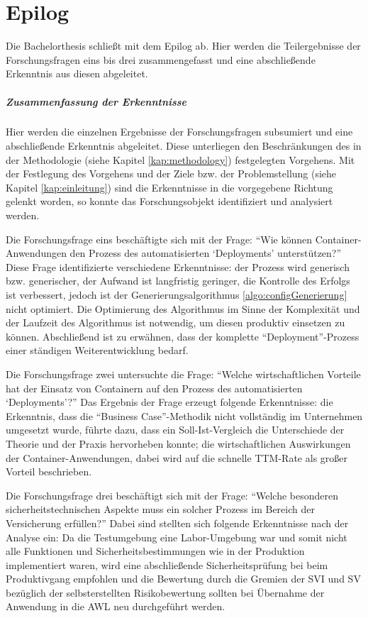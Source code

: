 \chapter{Epilog} \label{kritischeBetrachtung}
Die Bachelorthesis schließt mit dem Epilog ab. Hier werden die Teilergebnisse der Forschungsfragen eins bis drei zusammengefasst und eine abschließende Erkenntnis aus diesen abgeleitet. 
\paragraph{Zusammenfassung der Erkenntnisse}
Hier werden die einzelnen Ergebnisse der Forschungsfragen subsumiert und eine abschließende Erkenntnis abgeleitet. Diese unterliegen den Beschränkungen des in der Methodologie (siehe Kapitel \vref{kap:methodology}) festgelegten Vorgehens. Mit der Festlegung des Vorgehens und der Ziele bzw. der Problemstellung (siehe Kapitel \vref{kap:einleitung}) sind die Erkenntnisse in die vorgegebene Richtung gelenkt worden, so konnte das Forschungsobjekt identifiziert und analysiert werden.
\par
Die Forschungsfrage eins beschäftigte sich mit der Frage: \enquote{Wie können Container-Anwendungen den Prozess des automatisierten \enquote{Deployments} unterstützen?} Diese Frage identifizierte verschiedene Erkenntnisse: der Prozess wird generisch bzw. generischer, der Aufwand ist langfristig geringer, die Kontrolle des Erfolgs ist verbessert, jedoch ist der Generierungsalgorithmus \vref{algo:configGenerierung} nicht optimiert. Die Optimierung des Algorithmus im Sinne der Komplexität und der Laufzeit des Algorithmus ist notwendig, um diesen produktiv einsetzen zu können. Abschließend ist zu erwähnen, dass der komplette \enquote{Deployment}-Prozess einer ständigen Weiterentwicklung bedarf.
\par
Die Forschungsfrage zwei untersuchte die Frage: \enquote{Welche wirtschaftlichen Vorteile hat der Einsatz von Containern auf den Prozess des automatisierten \enquote{Deployments}?} Das Ergebnis der Frage erzeugt folgende Erkenntnisse: die Erkenntnis, dass die \enquote{Business Case}-Methodik nicht vollständig im Unternehmen umgesetzt wurde, führte dazu, dass ein Soll-Ist-Vergleich die Unterschiede der Theorie und der Praxis hervorheben konnte; die wirtschaftlichen Auswirkungen der Container-Anwendungen, dabei wird auf die schnelle \ac{TTM}-Rate als großer Vorteil beschrieben.
\par
Die Forschungsfrage drei beschäftigt sich mit der Frage: \enquote{Welche besonderen sicherheitstechnischen Aspekte muss ein solcher Prozess im Bereich der Versicherung erfüllen?} Dabei sind stellten sich folgende Erkenntnisse nach der Analyse ein: Da die Testumgebung eine Labor-Umgebung war und somit nicht alle Funktionen und Sicherheitsbestimmungen wie in der Produktion implementiert waren, wird eine abschließende Sicherheitsprüfung bei beim Produktivgang empfohlen und die Bewertung durch die Gremien der \ac{SVI} und \ac{SV} bezüglich der selbsterstellten Risikobewertung sollten bei Übernahme der Anwendung in die \ac{AWL} neu durchgeführt werden.

